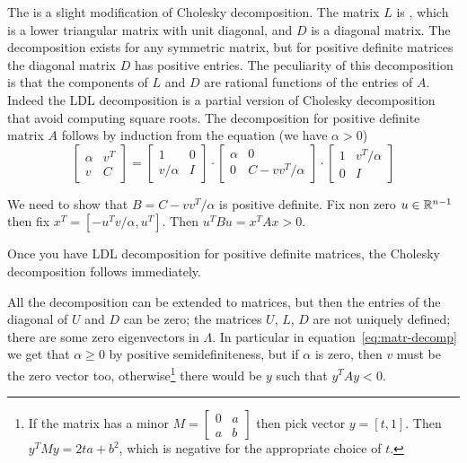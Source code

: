 \documentclass[a4paper,twoside,justified]{tufte-handout}
\begin{document}
The  is a slight modification of
Cholesky decomposition. The matrix $ L$ is , which is a lower triangular matrix with unit diagonal,
and $ D $ is a diagonal matrix. The decomposition exists for any
symmetric matrix, but for positive definite matrices the diagonal
matrix $D$ has positive entries. The peculiarity of this
decomposition is that the components of $ L $ and $ D $ are rational
functions of the entries of $ A $. Indeed the LDL decomposition is a
partial version of Cholesky decomposition that avoid computing square
roots. The decomposition for positive definite matrix $A$ follows by
induction from the equation (we have $\alpha>0$)
\begin{equation}\label{eq:matr-decomp}
  \begin{bmatrix}
    \alpha & v^{T} \\
    v & C
  \end{bmatrix} =
  \begin{bmatrix}
    1 & 0 \\
    v/\alpha & I
  \end{bmatrix} \cdot
  \begin{bmatrix}
    \alpha & 0 \\
    0 & C -vv^{T}/\alpha
  \end{bmatrix} \cdot
  \begin{bmatrix}
    1 & v^{T}/\alpha \\
    0 & I
  \end{bmatrix} 
\end{equation}

We need to show that $B = C - vv^{T}/\alpha $ is positive definite. Fix
non zero $ u\in\mathbb{R}^{n-1} $ then fix $ x^{T}=[-u^{T}v/\alpha, u^{T}]
$. Then $ u^{T}Bu = x^{T}Ax > 0$.

Once you have LDL decomposition for positive definite matrices,
the Cholesky decomposition follows immediately.

All the decomposition can be extended to  matrices, but then the entries of the diagonal of $ U
$ and $D$ can be zero; the matrices $ U $, $ L $, $ D $ are not uniquely
defined; there are some zero eigenvectors in $ \Lambda $. In
particular in equation~\eqref{eq:matr-decomp} we get that $ \alpha
\geq 0 $ by positive semidefiniteness, but if $ \alpha $ is zero, then
$ v $ must be the zero vector too, otherwise\footnote{If the matrix
  has a minor $M=\begin{bmatrix}
    0 & a\\ a & b
  \end{bmatrix}$ then pick vector $y=[t,1] $. Then $ y^{T}My =
  2ta+b^{2}$, which is negative for the appropriate choice of $ t $.}
  there would be $ y $ such that
  $ y^{T}Ay < 0 $.
\end{document}
